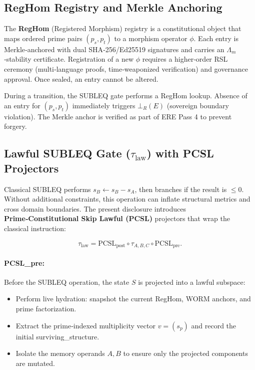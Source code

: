 \documentclass[11pt,a4paper]{article}
\theoremstyle{definition}
\theoremstyle{remark}
\begin{document}
\subsection{RegHom Registry and Merkle Anchoring}
\label{subsec:reghom}
The \textbf{RegHom} (Registered Morphism) registry is a constitutional object that maps ordered prime pairs $(p_s, p_t)$ to a morphism operator $\phi$. Each entry is Merkle‑anchored with dual SHA‑256/Ed25519 signatures and carries an $\Lambda_m$‑stability certificate. Registration of a new $\phi$ requires a higher‑order RSL ceremony (multi‑language proofs, time‑weaponized verification) and governance approval. Once sealed, an entry cannot be altered.

During a transition, the SUBLEQ gate performs a RegHom lookup. Absence of an entry for $(p_s, p_t)$ immediately triggers $\bot_R(E)$ (sovereign boundary violation). The Merkle anchor is verified as part of ERE Pass 4 to prevent forgery.

\subsection{Lawful SUBLEQ Gate ($\tau_\text{law}$) with PCSL Projectors}
\label{subsec:tau_law}
Classical SUBLEQ performs $s_B \gets s_B - s_A$, then branches if the result is $\le 0$. Without additional constraints, this operation can inflate structural metrics and cross domain boundaries. The present disclosure introduces \textbf{Prime‑Constitutional Skip Lawful (PCSL)} projectors that wrap the classical instruction:

\[
\tau_\text{law} = \text{PCSL}_\text{post} \circ \tau_{A,B,C} \circ \text{PCSL}_\text{pre}.
\]

\paragraph{PCSL\_pre:} Before the SUBLEQ operation, the state $S$ is projected into a lawful subspace:
\begin{itemize}[noitemsep]
    \item Perform live hydration: snapshot the current RegHom, WORM anchors, and prime factorization.
    \item Extract the prime‑indexed multiplicity vector $v = (s_p)$ and record the initial surviving\_structure.
    \item Isolate the memory operands $A, B$ to ensure only the projected components are mutated.
\end{itemize}
\end{document}
